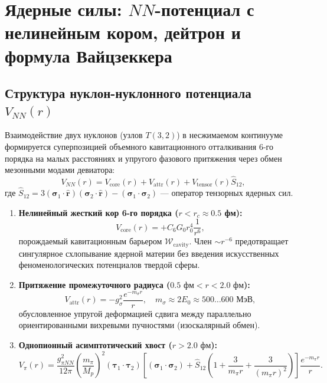 \documentclass[12pt,a4paper]{article}
\theoremstyle{definition}
\theoremstyle{remark}
\begin{document}
\section{Ядерные силы: $NN$-потенциал с нелинейным кором, дейтрон и формула Вайцзеккера}
\label{sec:nuclear}

\subsection{Структура нуклон-нуклонного потенциала $V_{NN}(r)$}
Взаимодействие двух нуклонов (узлов $T(3,2)$) в несжимаемом континууме формируется суперпозицией объемного кавитационного отталкивания 6-го порядка на малых расстояниях и упругого фазового притяжения через обмен мезонными модами девиатора:
\begin{equation}
	V_{NN}(r) = V_{\mathrm{core}}(r) + V_{\mathrm{attr}}(r) + V_{\mathrm{tensor}}(r) \hat{S}_{12},
	\label{eq:v_nn_structure}
\end{equation}
где $\hat{S}_{12} = 3(\boldsymbol{\sigma}_1 \cdot \hat{\mathbf{r}})(\boldsymbol{\sigma}_2 \cdot \hat{\mathbf{r}}) - (\boldsymbol{\sigma}_1 \cdot \boldsymbol{\sigma}_2)$ --- оператор тензорных ядерных сил.

\begin{enumerate}
	\item \textbf{Нелинейный жесткий кор 6-го порядка ($r < r_c \approx 0.5$ фм):}
	\begin{equation}
		V_{\mathrm{core}}(r) = + C_6 G_0 r_0^4 \frac{1}{r^6},
		\label{eq:v_core}
	\end{equation}
	порождаемый кавитационным барьером $\mathcal{W}_{\mathrm{cavity}}$. Член $\sim r^{-6}$ предотвращает сингулярное схлопывание ядерной материи без введения искусственных феноменологических потенциалов твердой сферы.
	
	\item \textbf{Притяжение промежуточного радиуса ($0.5 \text{ фм} < r < 2.0 \text{ фм}$):}
	\begin{equation}
		V_{\mathrm{attr}}(r) = - g_\sigma^2 \frac{e^{-m_\sigma r}}{r}, \quad m_\sigma \approx 2 E_0 \approx 500\dots 600 \text{ МэВ},
		\label{eq:v_attr}
	\end{equation}
	обусловленное упругой деформацией сдвига между параллельно ориентированными вихревыми пучностями (изоскалярный обмен).
	
	\item \textbf{Однопионный асимптотический хвост ($r > 2.0 \text{ фм}$):}
	\begin{equation}
		V_{\pi}(r) = \frac{g_{\pi NN}^2}{12\pi} \left(\frac{m_\pi}{M_p}\right)^2 (\boldsymbol{\tau}_1 \cdot \boldsymbol{\tau}_2) \left[ (\boldsymbol{\sigma}_1 \cdot \boldsymbol{\sigma}_2) + \hat{S}_{12} \left(1 + \frac{3}{m_\pi r} + \frac{3}{(m_\pi r)^2}\right) \right] \frac{e^{-m_\pi r}}{r}.
		\label{eq:v_pion}
	\end{equation}
\end{enumerate}
\end{document}
